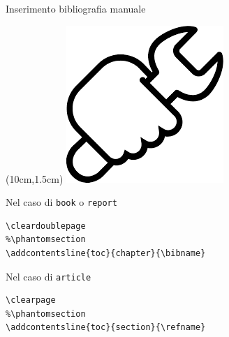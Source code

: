 \begin{frame}[fragile]{Inserimento bibliografia manuale}

\begin{textblock*}{2cm}(10cm,1.5cm)
      \includegraphics[scale=0.30]{res/images/manual}
\end{textblock*}

Nel caso di \texttt{book} o \texttt{report}
\begin{lstlisting}
\cleardoublepage
%\phantomsection
\addcontentsline{toc}{chapter}{\bibname}
\end{lstlisting}

\vfill

Nel caso di \texttt{article}
\begin{lstlisting}
\clearpage
%\phantomsection
\addcontentsline{toc}{section}{\refname}
\end{lstlisting}

\end{frame}